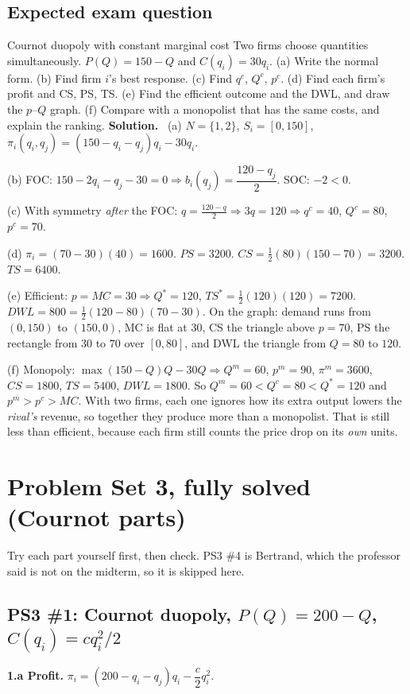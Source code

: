 \documentclass[11pt]{article}
\newcommand{\soln}{\tcblower\textbf{Solution.}\ }
\begin{document}
\subsection*{Expected exam question}
\begin{examq}{Cournot duopoly with constant marginal cost}
Two firms choose quantities simultaneously. $P(Q)=150-Q$ and $C(q_i)=30q_i$.
(a) Write the normal form. (b) Find firm $i$'s best response. (c) Find $q^c$, $Q^c$, $p^c$. (d) Find each firm's profit and CS, PS, TS. (e) Find the efficient outcome and the DWL, and draw the $p$--$Q$ graph. (f) Compare with a monopolist that has the same costs, and explain the ranking.
\soln
(a) $N=\{1,2\}$, $S_i=[0,150]$, $\pi_i(q_i,q_j)=(150-q_i-q_j)q_i-30q_i$.

(b) FOC: $150-2q_i-q_j-30=0\Rightarrow b_i(q_j)=\dfrac{120-q_j}{2}$. SOC: $-2<0$.

(c) With symmetry \emph{after} the FOC: $q=\tfrac{120-q}{2}\Rightarrow3q=120\Rightarrow q^c=40$, $Q^c=80$, $p^c=70$.

(d) $\pi_i=(70-30)(40)=1600$. $PS=3200$. $CS=\tfrac12(80)(150-70)=3200$. $TS=6400$.

(e) Efficient: $p=MC=30\Rightarrow Q^*=120$, $TS^*=\tfrac12(120)(120)=7200$. $DWL=800=\tfrac12(120-80)(70-30)$. On the graph: demand runs from $(0,150)$ to $(150,0)$, MC is flat at $30$, CS the triangle above $p=70$, PS the rectangle from $30$ to $70$ over $[0,80]$, and DWL the triangle from $Q=80$ to $120$.

(f) Monopoly: $\max(150-Q)Q-30Q\Rightarrow Q^m=60$, $p^m=90$, $\pi^m=3600$, $CS=1800$, $TS=5400$, $DWL=1800$. So $Q^m=60<Q^c=80<Q^*=120$ and $p^m>p^c>MC$. With two firms, each one ignores how its extra output lowers the \emph{rival's} revenue, so together they produce more than a monopolist. That is still less than efficient, because each firm still counts the price drop on its \emph{own} units.
\end{examq}

\section{Problem Set 3, fully solved (Cournot parts)}
Try each part yourself first, then check. PS3 \#4 is Bertrand, which the professor said is not on the midterm, so it is skipped here.

\subsection*{PS3 \#1: Cournot duopoly, $P(Q)=200-Q$, $C(q_i)=cq_i^2/2$}
\textbf{1.a Profit.} $\pi_i=(200-q_i-q_j)q_i-\dfrac c2q_i^2$.
\end{document}

